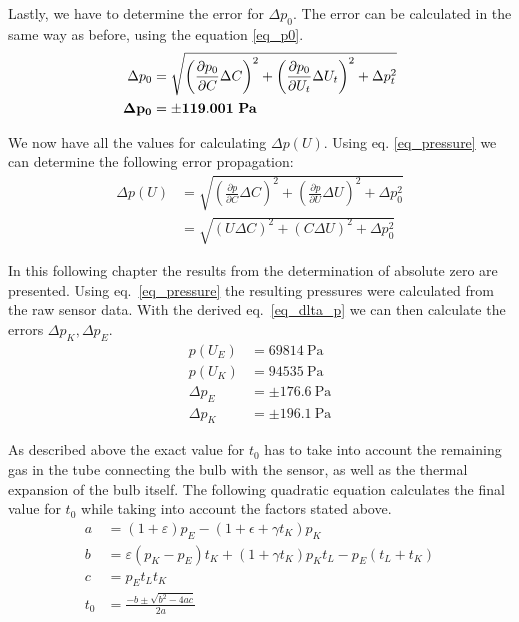     Lastly, we have to determine the error for $\Delta p_0$. The error can be calculated in the same way as before, using the equation \ref{eq_p0}.
    \begin{align}
        \Delta p_0 &= \sqrt{ \left(\frac{\partial p_0}{\partial C} \Delta C \right)^2 +
                            \left(\frac{\partial p_0}{\partial U_t} \Delta U_t \right)^2 +
                            \Delta p_t^2}\\
        \bf \Delta p_0 &= \bf \pm 119.001 ~\si{\bf\pascal} \label{dlta_p0}
    \end{align}

    We now have all the values for calculating $\Delta p(U)$. Using eq. \ref{eq_pressure} we can determine the following error propagation:
    \begin{align}
        \Delta p(U) &= \sqrt{ \left(\frac{\partial p}{\partial C} \Delta C \right)^2 +
                            \left(\frac{\partial p}{\partial U} \Delta U \right)^2 +
                            \Delta p_0^2}\\
        &= \sqrt{ \left( U \Delta C \right)^2 +
                \left( C \Delta U \right)^2 + 
                \Delta p_0^2} \label{eq_dlta_p}
    \end{align}

    In this following chapter the results from the determination of absolute zero are presented.
    Using eq.~\ref{eq_pressure} the resulting pressures were calculated from the raw sensor data.
    With the derived eq.~\ref{eq_dlta_p} we can then calculate the errors $\Delta p_K, \Delta p_E$.
    \begin{align}
        p(U_E) &= 69814 ~\si{\pascal}\\
        p(U_K) &= 94535 ~\si{\pascal}\\
        \Delta p_E &= \pm 176.6 ~\si{\pascal} \label{val_pE}\\
        \Delta p_K &= \pm 196.1 ~\si{\pascal} \label{val_pK}
    \end{align}

    As described above the exact value for $t_0$ has to take into account the remaining gas
    in the tube connecting the bulb with the sensor, as well as the thermal expansion of the
    bulb itself. The following quadratic equation calculates the final value for $t_0$ while
    taking into account the factors stated above.
    \begin{align}
        a &= (1 + \varepsilon)p_E - (1 + \epsilon + \gamma t_K)p_K\\
        b &= \varepsilon(p_K - p_E)t_K + (1 + \gamma t_K)p_K t_L - p_E(t_L + t_K)\\
        c &= p_E t_L t_K\\
        t_0 &= \frac{-b \pm \sqrt{b^2 - 4a c}}{2a} \label{eq_t0}
    \end{align}

